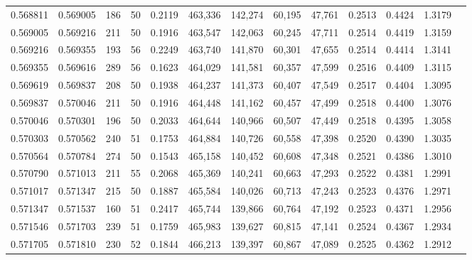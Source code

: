 \begin{tabular}{rrrrrrrrrrrrr}
0.568811 & 0.569005 &   186 &  50 &                                     0.2119 & 463,336 & 142,274 &  60,195 &  47,761 & 0.2513 & 0.4424 & 1.3179 \\
0.569005 & 0.569216 &   211 &  50 &                                     0.1916 & 463,547 & 142,063 &  60,245 &  47,711 & 0.2514 & 0.4419 & 1.3159 \\
0.569216 & 0.569355 &   193 &  56 &                                     0.2249 & 463,740 & 141,870 &  60,301 &  47,655 & 0.2514 & 0.4414 & 1.3141 \\
0.569355 & 0.569616 &   289 &  56 &                                     0.1623 & 464,029 & 141,581 &  60,357 &  47,599 & 0.2516 & 0.4409 & 1.3115 \\
0.569619 & 0.569837 &   208 &  50 &                                     0.1938 & 464,237 & 141,373 &  60,407 &  47,549 & 0.2517 & 0.4404 & 1.3095 \\
0.569837 & 0.570046 &   211 &  50 &                                     0.1916 & 464,448 & 141,162 &  60,457 &  47,499 & 0.2518 & 0.4400 & 1.3076 \\
0.570046 & 0.570301 &   196 &  50 &                                     0.2033 & 464,644 & 140,966 &  60,507 &  47,449 & 0.2518 & 0.4395 & 1.3058 \\
0.570303 & 0.570562 &   240 &  51 &                                     0.1753 & 464,884 & 140,726 &  60,558 &  47,398 & 0.2520 & 0.4390 & 1.3035 \\
0.570564 & 0.570784 &   274 &  50 &                                     0.1543 & 465,158 & 140,452 &  60,608 &  47,348 & 0.2521 & 0.4386 & 1.3010 \\
0.570790 & 0.571013 &   211 &  55 &                                     0.2068 & 465,369 & 140,241 &  60,663 &  47,293 & 0.2522 & 0.4381 & 1.2991 \\
0.571017 & 0.571347 &   215 &  50 &                                     0.1887 & 465,584 & 140,026 &  60,713 &  47,243 & 0.2523 & 0.4376 & 1.2971 \\
0.571347 & 0.571537 &   160 &  51 &                                     0.2417 & 465,744 & 139,866 &  60,764 &  47,192 & 0.2523 & 0.4371 & 1.2956 \\
0.571546 & 0.571703 &   239 &  51 &                                     0.1759 & 465,983 & 139,627 &  60,815 &  47,141 & 0.2524 & 0.4367 & 1.2934 \\
0.571705 & 0.571810 &   230 &  52 &                                     0.1844 & 466,213 & 139,397 &  60,867 &  47,089 & 0.2525 & 0.4362 & 1.2912 \\

\end{tabular}
